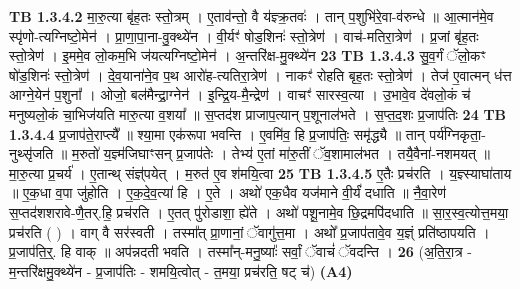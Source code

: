 \documentclass[17pt]{extarticle}
\begin{document}
                  \newline
                                \textbf{ TB 1.3.4.2} \newline
                  मा॒रु॒त्या बृ॑ह॒तः स्तो॒त्रम् । ए॒ताव॑न्तो॒ वै य॑ज्ञ्क्र॒तवः॑ । तान् प॒शुभि॑रे॒वा-व॑रुन्धे ॥ आ॒त्मान॑मे॒व स्पृ॑णो-त्यग्निष्टो॒मेन॑ । प्रा॒णा॒पा॒ना-वु॒क्थ्ये॑न । वी॒र्यꣳ॑ षोड॒शिनः॑ स्तो॒त्रेण॑ । वाच॑-मतिरा॒त्रेण॑ । प्र॒जां बृ॑ह॒तः स्तो॒त्रेण॑ । इ॒ममे॒व लो॒कम॒भि ज॑यत्यग्निष्टो॒मेन॑ । अ॒न्तरि॑क्ष-मु॒क्थ्ये॑न \textbf{ 23} \newline
                  \newline
                                \textbf{ TB 1.3.4.3} \newline
                  सु॒व॒र्गं ॅलो॒कꣳ षो॑ड॒शिनः॑ स्तो॒त्रेण॑ । दे॒व॒याना॑ने॒व प॒थ आरो॑ह-त्यतिरा॒त्रेण॑ । नाकꣳ॑ रोहति बृह॒तः स्तो॒त्रेण॑ । तेज॑ ए॒वात्मन् ध॑त्त आग्ने॒येन॑ प॒शुना᳚ । ओजो॒ बल॑मैन्द्रा॒ग्नेन॑ । इ॒न्द्रि॒य-मै॒न्द्रेण॑ । वाचꣳ॑ सारस्व॒त्या । उ॒भावे॒व दे॑वलो॒कं च॑ मनुष्यलो॒कं चा॒भिज॑यति मारु॒त्या व॒शया᳚ ॥ स॒प्तद॑श प्राजाप॒त्यान् प॒शूनाल॑भते । स॒प्त॒द॒शः प्र॒जाप॑तिः \textbf{ 24} \newline
                  \newline
                                \textbf{ TB 1.3.4.4} \newline
                  प्र॒जाप॑ते॒राप्त्यै᳚ ॥ श्या॒मा एक॑रूपा भवन्ति । ए॒वमि॑व॒ हि प्र॒जाप॑तिः॒ समृ॑द्ध्यै ॥ तान् पर्य॑ग्निकृता॒-नुथ्सृ॑जति ॥ म॒रुतो॑ य॒ज्ञ्म॑जिघाꣳसन् प्र॒जाप॑तेः । तेभ्य॑ ए॒तां मा॑रु॒तीं ॅव॒शामाल॑भत । तयै॒वैना॑-नशमयत् ॥ मा॒रु॒त्या प्र॒चर्य॑ । ए॒तान्थ् संज्ञ्॑पयेत् । म॒रुत॑ ए॒व श॑मयि॒त्वा \textbf{ 25} \newline
                  \newline
                                \textbf{ TB 1.3.4.5} \newline
                  ए॒तैः प्रच॑रति । य॒ज्ञ्स्याघा॑ताय ॥ ए॒क॒धा व॒पा जु॑होति । ए॒क॒दे॒व॒त्या॑ हि । ए॒ते । अथो॑ एक॒धैव यज॑माने वी॒र्यं॑ दधाति ॥ नै॒वा॒रेण॑ स॒प्तद॑शशरावे-णै॒तर्.हि॒ प्रच॑रति । ए॒तत् पु॑रोडाशा॒ ह्ये॑ते । अथो॑ पशू॒नामे॒व छि॒द्रमपि॑दधाति ॥ सा॒र॒स्व॒त्योत्त॒मया॒ प्रच॑रति ( ) । वाग् वै सर॑स्वती । तस्मा᳚त् प्रा॒णानां॒ ॅवागु॑त्त॒मा । अथो᳚ प्र॒जाप॑तावे॒व य॒ज्ञ्ं प्रति॑ष्ठापयति । प्र॒जाप॑ति॒र्॒. हि वाक् ॥ अप॑न्नदती भवति । तस्मा᳚न्-मनु॒ष्याः᳚ सर्वां॒ ॅवाचं॑ ॅवदन्ति । \textbf{ 26} \newline
                  \newline
                                    (अ॒ति॒रा॒त्र - म॒न्तरि॑क्षमु॒क्थ्ये॑न - प्र॒जाप॑तिः - शमयि॒त्वोत् - त॒मया॒ प्रच॑रति॒ षट् च॑) \textbf{(A4)} \newline \newline
\end{document}
